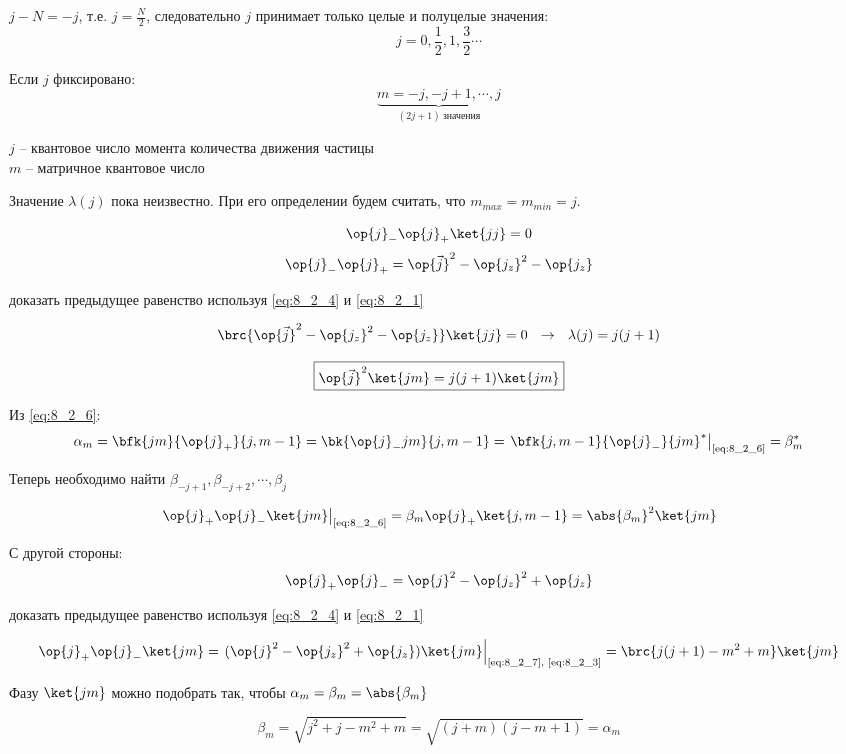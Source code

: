 $j - N = -j$, т.е. $j = \frac{N}{2}$, следовательно $j$ принимает только целые и полуцелые значения:
$$
j = 0, \frac{1}{2}, 1, \frac{3}{2} \cdots
$$

Если $j$ фиксировано:
$$
\underbrace{m = -j, -j + 1, \cdots, j}_{(2j + 1)~\text{значения}}
$$

\noindent
$j$ -- квантовое число момента количества движения частицы\\
$m$ -- матричное квантовое число

Значение $\lambda(j)$ пока неизвестно. При его определении будем считать, что $m_{max} = m_{min} = j$.

$$
\op{j}_{-} \op{j}_{+} \ket{jj} = 0
$$
$$
\op{j}_{-} \op{j}_{+} = \op{\vec{j}}^2 - \op{j_z}^2 - \op{j_z}
$$
\begin{excr}
доказать предыдущее равенство используя \eqref{eq:8_2_4} и \eqref{eq:8_2_1}
\end{excr}

$$
\brc{\op{\vec{j}}^2 - \op{j_z}^2 - \op{j_z}} \ket{jj} = 0 ~~\rightarrow~~ \lambda(j) = j(j+1)
$$

\begin{equation}
\label{eq:8_2_7}
\boxed {
	\op{\vec{j}}^2 \ket{jm} = j(j+1) \ket{jm}
}
\end{equation}

Из \eqref{eq:8_2_6}:
$$
\alpha_m = \bfk{jm}{\op{j}_{+}}{j, m-1} = \bk{\op{j}_{-}jm}{j, m-1} = \left. \bfk{j,m-1}{\op{j}_{-}}{jm}^* \right|_{\text{\eqref{eq:8_2_6}}} = \beta_m^*
$$

Теперь необходимо найти $\beta_{-j+1}, \beta_{-j+2}, \cdots, \beta_{j}$

$$
\left. \op{j}_{+} \op{j}_{-} \ket{jm} \right|_{\text{\eqref{eq:8_2_6}}} = \beta_m \op{j}_{+} \ket{j, m-1} = \abs{\beta_m}^2 \ket{jm}
$$

С другой стороны:
$$
\op{j}_{+} \op{j}_{-} = \op{j}^2 - \op{j_z}^2 + \op{j_z}
$$

\begin{excr}
доказать предыдущее равенство используя \eqref{eq:8_2_4} и \eqref{eq:8_2_1}
\end{excr}

$$
\op{j}_{+} \op{j}_{-} \ket{jm} = \left. (\op{j}^2 - \op{j_z}^2 + \op{j_z}) \ket{jm} \right|_{\text{\eqref{eq:8_2_7}, \eqref{eq:8_2_3}}} = \brc{j(j+1) - m^2 + m} \ket{jm}
$$

Фазу $\ket{jm}$ можно подобрать так, чтобы $\alpha_m = \beta_m  = \abs{\beta_m}$

$$
\beta_m = \sqrt{j^2 + j - m^2 + m} = \sqrt{(j+m)(j-m+1)} = \alpha_m
$$

